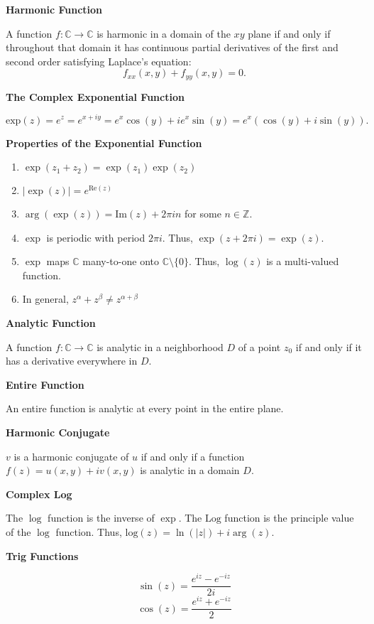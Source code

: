 \documentclass{article}
\newcommand{\C}{\mathbb C}
\begin{document}
\medskip\noindent\textbf{Harmonic Function}

	A function $f: \C \to \C$ is harmonic in a domain of the $xy$ plane if and only if throughout that domain it has continuous partial derivatives of the first and second order satisfying Laplace's equation: $$f_{xx}(x,y) + f_{yy}(x,y)=0.$$

\medskip\noindent\textbf{The Complex Exponential Function}

	$$\text{exp}(z) = e^z = e^{x+iy} = e^x\cos(y) + ie^x\sin(y) = e^x(\cos(y)+i\sin(y)).$$

\medskip\noindent\textbf{Properties of the Exponential Function}
\begin{enumerate}
	\item $\exp(z_1 + z_2) = \exp(z_1)\exp(z_2)$
	\item $|\exp(z)| = e^{\text{Re}(z)}$
	\item $\arg(\exp(z)) = \text{Im}(z) + 2\pi in$ for some $n \in \mathbb Z$.
	\item $\exp$ is periodic with period $2\pi i$. Thus, $\exp(z+2\pi i) = \exp(z).$
	\item $\exp$ maps $\C$ many-to-one onto $\C \setminus \{0\}$. Thus, $\log(z)$ is a multi-valued function.
    \item In general, $z^\alpha + z^\beta \neq z^{\alpha + \beta}$
\end{enumerate}

\medskip\noindent\textbf{Analytic Function}

	A function $f: \C \to \C$ is analytic in a neighborhood $D$ of a point $z_0$ if and only if it has a derivative everywhere in $D$.

\medskip\noindent\textbf{Entire Function}

	An entire function is analytic at every point in the entire plane.

\medskip\noindent\textbf{Harmonic Conjugate}

	$v$ is a harmonic conjugate of $u$ if and only if a function $f(z)=u(x,y) + iv(x,y)$ is analytic in a domain $D$.

\medskip\noindent\textbf{Complex Log}

	The $\log$ function is the inverse of $\exp$. The $\text{Log}$ function is the principle value of the $\log$ function.
	Thus, $\text{log}(z) = \ln(|z|) + i\arg(z)$.

\medskip\noindent\textbf{Trig Functions}

    $$\sin(z) = \frac{e^{iz} - e^{-iz}}{2i}$$
    $$\cos(z) = \frac{e^{iz}+e^{-iz}}{2}$$
\end{document}
